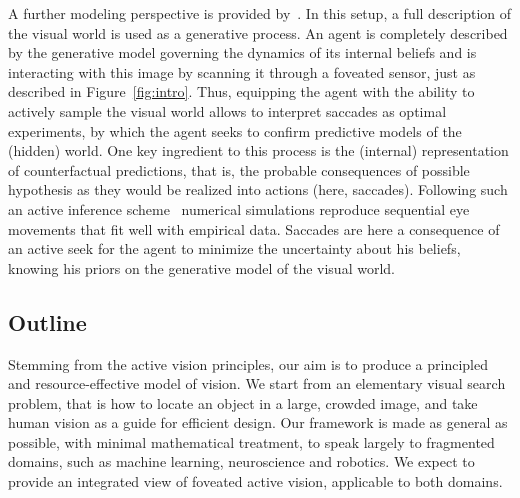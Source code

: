 A further modeling perspective is provided by~\cite{Friston12}. In this setup, a full description of the visual world is used as a generative process. An agent is completely described by the generative model governing the dynamics of its internal beliefs and is interacting with this image by scanning it through a foveated sensor, just as described in Figure~\ref{fig:intro}. Thus, equipping the agent with the ability to actively sample the visual world %
allows to interpret saccades as optimal experiments, by which the agent seeks to confirm predictive models of the (hidden) world. One key ingredient to this process is the (internal) representation of counterfactual predictions, that is, the probable consequences of possible hypothesis as they would be realized into actions (here, saccades). Following such an active inference scheme~\cite{Mirza18} numerical simulations reproduce sequential eye movements that fit well with empirical data. %
Saccades %
are here a consequence of an active seek for the agent to minimize the uncertainty about his beliefs, knowing his priors on the generative model of the visual world. 

\subsection*{Outline}


Stemming from the active vision principles, our aim is to produce a principled and resource-effective model of vision. 
We start from an elementary visual search problem, that is how to locate an object in a large, crowded image, and take human vision as a guide for efficient design. Our framework is made as general as possible, with minimal mathematical treatment, to speak largely to fragmented domains, such as machine learning, neuroscience and robotics. We expect to provide an integrated view of foveated active vision, applicable to both domains. 

